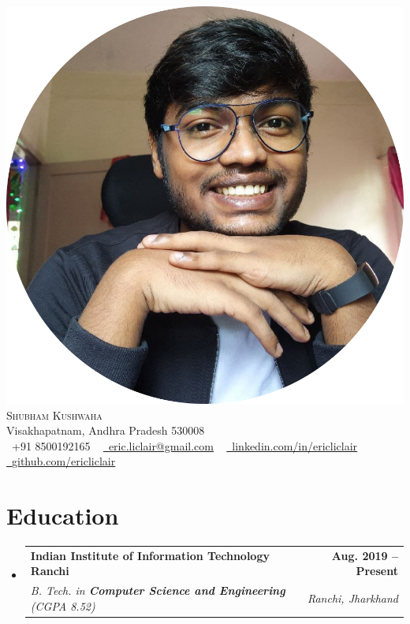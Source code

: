 \documentclass[letterpaper,11pt]{article}
\makeatletter
\newcommand{\resumeSubheading}[4]{
  \vspace{-2pt}\item
    \begin{tabular*}{1.0\textwidth}[t]{l@{\extracolsep{\fill}}r}
      \textbf{#1} & \textbf{\small #2} \\
      \textit{\small#3} & \textit{\small #4} \\
    \end{tabular*}\vspace{-7pt}
}
\newcommand{\resumeSubHeadingListStart}{\begin{itemize}[leftmargin=0.0in, label={}]}
\newcommand{\resumeSubHeadingListEnd}{\end{itemize}}
\makeatother
\begin{document}

\begin{center}
    {\includegraphics[scale=0.05]{images/profile.png}}\\
    {\Huge \scshape Shubham Kushwaha} \\ \vspace{1pt}
    Visakhapatnam, Andhra Pradesh 530008 \\ \vspace{1pt}
    \small \raisebox{-0.1\height}\faPhone\ +91 8500192165 ~ \href{mailto:eric.liclair@gmail.com}{\raisebox{-0.2\height}\faEnvelope\  \underline{eric.liclair@gmail.com}} ~
    \href{https://linkedin.com/in//}{\raisebox{-0.2\height}\faLinkedin\ \underline{linkedin.com/in/ericliclair}}  ~
    \href{https://github.com/}{\raisebox{-0.2\height}\faGithub\ \underline{github.com/ericliclair}}
    \vspace{-8pt}
\end{center}


\section{Education}
  \resumeSubHeadingListStart
    \resumeSubheading
      {Indian Institute of Information Technology Ranchi}{Aug. 2019 -- Present}
      {B. Tech. in \textbf{Computer Science and Engineering} (CGPA 8.52)}{Ranchi, Jharkhand}
  \resumeSubHeadingListEnd
\end{document}
